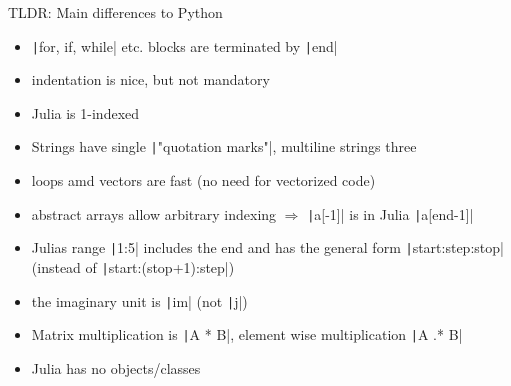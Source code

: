 \documentclass[aspectratio=169, 12pt]{beamer}
\begin{document}
    \begin{frame}[fragile]{TLDR: Main differences to Python}
        \begin{itemize}
            \item \texttt|for, if, while| etc. blocks are terminated by  \texttt|end|
            \item indentation is nice, but not mandatory
            \item \alert{Julia is 1-indexed}
            \item Strings have single \texttt|"quotation marks"|, multiline strings three
            \pause
            \item loops amd vectors are fast (no need for vectorized code)
            \item abstract arrays allow arbitrary indexing $\Rightarrow$ \texttt|a[-1]| is in Julia \texttt|a[end-1]|
            \item Julias range \texttt|1:5| includes the end and has the general form \texttt|start:step:stop| (instead of \texttt|start:(stop+1):step|)
            \item the imaginary unit is \texttt|im| (not \texttt|j|)
            \pause
            \item Matrix multiplication is \texttt|A * B|, element wise multiplication \texttt|A .* B|
            \item Julia has no objects/classes
        \end{itemize}
    \end{frame}
\end{document}
